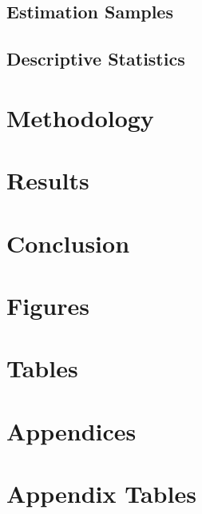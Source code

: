 \documentclass{article}[11pt,subeqn]
\newcommand{\twinfolder}{./../../../Twins}
\begin{document}
\begin{spacing}{1.4}
\subsection{Estimation Samples}


\subsection{Descriptive Statistics}



\section{Methodology}
\label{TWINscn:method}


\section{Results}


\section{Conclusion}





\newpage
\section*{Figures}


\clearpage

\section*{Tables}

\clearpage
\newpage



\newpage
\appendix
\section*{Appendices}

\section{Appendix Tables}



\end{spacing}
\end{document}
